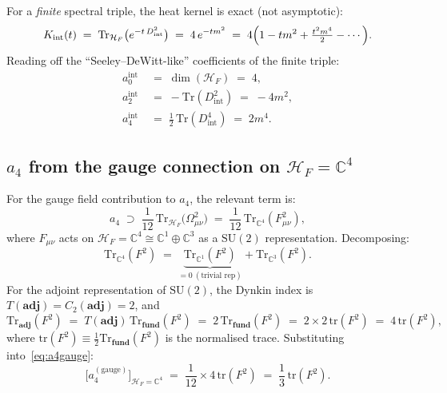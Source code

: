 \documentclass[11pt,a4paper]{article}
\theoremstyle{definition}
\theoremstyle{remark}
\begin{document}
For a \emph{finite} spectral triple, the heat kernel is exact (not asymptotic):
\begin{equation}
  K_{\mathrm{int}}(t) \;=\; \mathrm{Tr}_{\mathcal{H}_F}\bigl(e^{-t\,D_{\mathrm{int}}^2}\bigr)
  \;=\; 4\,e^{-tm^2}
  \;=\; 4\Bigl(1 - tm^2 + \tfrac{t^2m^4}{2} - \cdots\Bigr).
  \label{eq:Kint}
\end{equation}
Reading off the ``Seeley--DeWitt-like'' coefficients of the finite triple:
\begin{align}
  a_0^{\mathrm{int}} &\;=\; \dim(\mathcal{H}_F) \;=\; 4,
    \label{eq:a0int}\\
  a_2^{\mathrm{int}} &\;=\; -\mathrm{Tr}(D_{\mathrm{int}}^2) \;=\; -4m^2,
    \label{eq:a2int}\\
  a_4^{\mathrm{int}} &\;=\; \tfrac{1}{2}\,\mathrm{Tr}(D_{\mathrm{int}}^4)
    \;=\; 2m^4.
    \label{eq:a4int}
\end{align}

\subsection{$a_4$ from the gauge connection on $\mathcal{H}_F = \mathbb{C}^4$}

For the gauge field contribution to $a_4$, the relevant term is:
\begin{equation}
  a_4 \;\supset\; \frac{1}{12}\,\mathrm{Tr}_{\mathcal{H}_F}\!\bigl(\Omega_{\mu\nu}^2\bigr)
  \;=\; \frac{1}{12}\,\mathrm{Tr}_{\mathbb{C}^4}(F_{\mu\nu}^2),
  \label{eq:a4gauge}
\end{equation}
where $F_{\mu\nu}$ acts on $\mathcal{H}_F = \mathbb{C}^4 \cong \mathbb{C}^1 \oplus
\mathbb{C}^3$ as a $\mathrm{SU}(2)$ representation.
Decomposing:
\begin{equation}
  \mathrm{Tr}_{\mathbb{C}^4}(F^2)
  \;=\; \underbrace{\mathrm{Tr}_{\mathbb{C}^1}(F^2)}_{= 0\ (\text{trivial rep})}
  + \mathrm{Tr}_{\mathbb{C}^3}(F^2).
  \label{eq:a4decomp}
\end{equation}
For the adjoint representation of $\mathrm{SU}(2)$, the Dynkin index is
$T(\mathbf{adj}) = C_2(\mathbf{adj}) = 2$, and
\begin{equation}
  \mathrm{Tr}_{\mathbf{adj}}(F^2)
  \;=\; T(\mathbf{adj})\,\mathrm{Tr}_{\mathbf{fund}}(F^2)
  \;=\; 2\,\mathrm{Tr}_{\mathbf{fund}}(F^2)
  \;=\; 2 \times 2\,\mathrm{tr}(F^2)
  \;=\; 4\,\mathrm{tr}(F^2),
  \label{eq:Tradj}
\end{equation}
where $\mathrm{tr}(F^2) \equiv \frac{1}{2}\mathrm{Tr}_{\mathbf{fund}}(F^2)$ is the
normalised trace.
Substituting into~\eqref{eq:a4gauge}:
\begin{equation}
  \bigl[a_4^{(\mathrm{gauge})}\bigr]_{\mathcal{H}_F = \mathbb{C}^4}
  \;=\; \frac{1}{12} \times 4\,\mathrm{tr}(F^2)
  \;=\; \frac{1}{3}\,\mathrm{tr}(F^2).
  \label{eq:a4gauge_final}
\end{equation}
\end{document}
